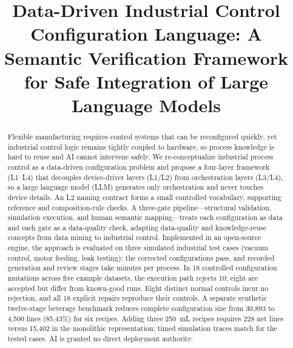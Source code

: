 \documentclass[conference]{IEEEtran}
\begin{document}
\title{Data-Driven Industrial Control Configuration Language: A Semantic Verification Framework for Safe Integration of Large Language Models}

\author{
\and
{}
}

\maketitle

\begin{abstract}
Flexible manufacturing requires control systems that can be reconfigured quickly, yet industrial control logic remains tightly coupled to hardware, so process knowledge is hard to reuse and AI cannot intervene safely. We re-conceptualize industrial process control as a data-driven configuration problem and propose a four-layer framework (L1--L4) that decouples device-driver layers (L1/L2) from orchestration layers (L3/L4), so a large language model (LLM) generates only orchestration and never touches device details. An L2 naming contract forms a small controlled vocabulary, supporting reference and composition-rule checks. A three-gate pipeline---structural validation, simulation execution, and human semantic mapping---treats each configuration as data and each gate as a data-quality check, adapting data-quality and knowledge-reuse concepts from data mining to industrial control. Implemented in an open-source engine, the approach is evaluated on three simulated industrial test cases (vacuum control, motor feeding, leak testing): the corrected configurations pass, and recorded generation and review stages take minutes per process. In 18 controlled configuration mutations across five example datasets, the execution path rejects 10; eight are accepted but differ from known-good runs. Eight distinct normal controls incur no rejection, and all 18 explicit repairs reproduce their controls. A separate synthetic twelve-stage beverage benchmark reduces complete configuration size from 30,893 to 4,500 lines (85.43\%) for six recipes. Adding three 250~mL recipes requires 228 net lines versus 15,402 in the monolithic representation; timed simulation traces match for the tested cases. AI is granted no direct deployment authority.
\end{abstract}
\end{document}
